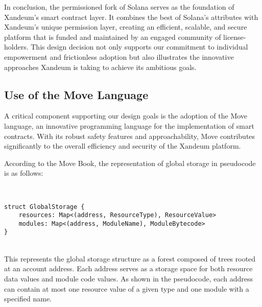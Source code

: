\documentclass[11 pt]{article}   	%
\begin{document}
In conclusion, the permissioned fork of Solana serves as the foundation of Xandeum's smart contract layer. It combines the best of Solana's attributes with Xandeum's unique permission layer, creating an efficient, scalable, and secure platform that is funded and maintained by an engaged community of license-holders. This design decision not only supports our commitment to individual empowerment and frictionless adoption but also illustrates the innovative approaches Xandeum is taking to achieve its ambitious goals.

\subsection{Use of the Move Language}
A critical component supporting our design goals is the adoption of the Move language, an innovative programming language for the implementation of smart contracts. With its robust safety features and approachability, Move contributes significantly to the overall efficiency and security of the Xandeum platform.

According to the Move Book, the representation of global storage in pseudocode is as follows:

\ \\
\begin{lstlisting}[caption=Global Storage in Move]
struct GlobalStorage {
    resources: Map<(address, ResourceType), ResourceValue>
    modules: Map<(address, ModuleName), ModuleBytecode>
}
\end{lstlisting}
\ \\

This represents the global storage structure as a forest composed of trees rooted at an account address. Each address serves as a storage space for both resource data values and module code values. As shown in the pseudocode, each address can contain at most one resource value of a given type and one module with a specified name.
\end{document}
